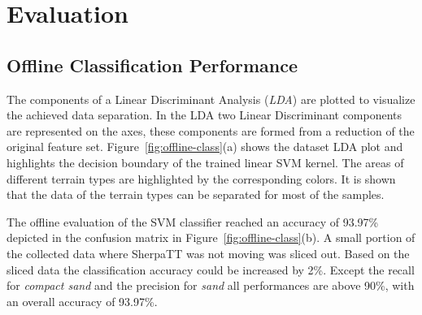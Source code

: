 
\section{Evaluation}
\subsection{Offline Classification Performance}

The components of a Linear Discriminant Analysis (\emph{LDA}) are plotted to visualize the achieved data separation. 
In the LDA two Linear Discriminant components are represented on the axes, these components are formed from a reduction of the original feature set.
Figure~\ref{fig:offline-class}(a) shows the dataset LDA plot and highlights the decision boundary of the trained linear SVM kernel. 
The areas of different terrain types are highlighted by the corresponding colors. 
It is shown that the data of the terrain types can be separated for most of the samples.

The offline evaluation of the SVM classifier reached an accuracy of 93.97\% depicted in the confusion matrix in Figure~\ref{fig:offline-class}(b). 
A small portion of the collected data where SherpaTT was not moving was sliced out. 
Based on the sliced data the classification accuracy could be increased by 2\%.
Except the recall for \emph{compact sand} and the precision for \emph{sand} all performances are above 90\%, with an overall accuracy of 93.97\%.

